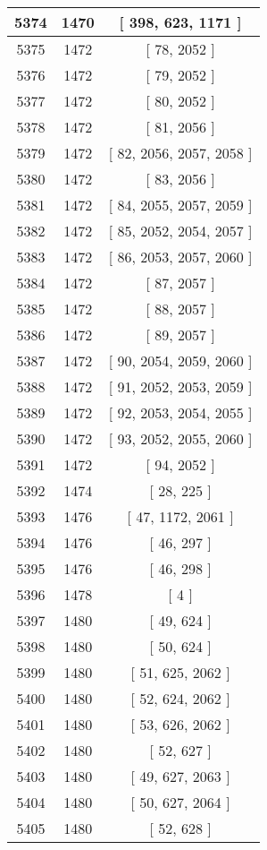 \begin{center}
\begin{longtable}[H]{|| c c c ||}
\hline
5374 & 1470 & [ 398, 623, 1171 ] \\ 
\hline
5375 & 1472 & [ 78, 2052 ] \\ 
\hline
5376 & 1472 & [ 79, 2052 ] \\ 
\hline
5377 & 1472 & [ 80, 2052 ] \\ 
\hline
5378 & 1472 & [ 81, 2056 ] \\ 
\hline
5379 & 1472 & [ 82, 2056, 2057, 2058 ] \\ 
\hline
5380 & 1472 & [ 83, 2056 ] \\ 
\hline
5381 & 1472 & [ 84, 2055, 2057, 2059 ] \\ 
\hline
5382 & 1472 & [ 85, 2052, 2054, 2057 ] \\ 
\hline
5383 & 1472 & [ 86, 2053, 2057, 2060 ] \\ 
\hline
5384 & 1472 & [ 87, 2057 ] \\ 
\hline
5385 & 1472 & [ 88, 2057 ] \\ 
\hline
5386 & 1472 & [ 89, 2057 ] \\ 
\hline
5387 & 1472 & [ 90, 2054, 2059, 2060 ] \\ 
\hline
5388 & 1472 & [ 91, 2052, 2053, 2059 ] \\ 
\hline
5389 & 1472 & [ 92, 2053, 2054, 2055 ] \\ 
\hline
5390 & 1472 & [ 93, 2052, 2055, 2060 ] \\ 
\hline
5391 & 1472 & [ 94, 2052 ] \\ 
\hline
5392 & 1474 & [ 28, 225 ] \\ 
\hline
5393 & 1476 & [ 47, 1172, 2061 ] \\ 
\hline
5394 & 1476 & [ 46, 297 ] \\ 
\hline
5395 & 1476 & [ 46, 298 ] \\ 
\hline
5396 & 1478 & [ 4 ] \\ 
\hline
5397 & 1480 & [ 49, 624 ] \\ 
\hline
5398 & 1480 & [ 50, 624 ] \\ 
\hline
5399 & 1480 & [ 51, 625, 2062 ] \\ 
\hline
5400 & 1480 & [ 52, 624, 2062 ] \\ 
\hline
5401 & 1480 & [ 53, 626, 2062 ] \\ 
\hline
5402 & 1480 & [ 52, 627 ] \\ 
\hline
5403 & 1480 & [ 49, 627, 2063 ] \\ 
\hline
5404 & 1480 & [ 50, 627, 2064 ] \\ 
\hline
5405 & 1480 & [ 52, 628 ] \\ 

\end{longtable}
\end{center}
